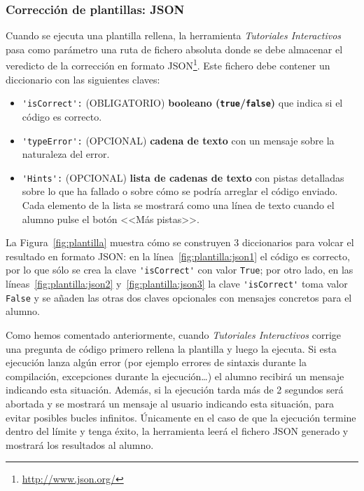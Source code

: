 \documentclass[]{article}
\newcommand{\code}[1]{{\lstinline[basicstyle=\ttfamily,mathescape]!#1!}}
\newcommand{\toolname}{\emph{Tutoriales Interactivos}}
\begin{document}
\subsubsection{Corrección de plantillas: JSON}
Cuando se ejecuta una plantilla rellena, la herramienta \toolname{} pasa como parámetro una ruta de fichero absoluta donde se debe almacenar el veredicto de la corrección en formato JSON\footnote{\url{http://www.json.org/}}. Este fichero debe contener un diccionario con las siguientes claves:
\begin{itemize}
	\item \code{'isCorrect':} {\sf (OBLIGATORIO)} \textbf{booleano (\code{true}/\code{false})} que indica si el código es correcto.
	\item \code{'typeError':} {\sf (OPCIONAL)} \textbf{cadena de texto} con un mensaje sobre la naturaleza del error. 
	\item \code{'Hints':} {\sf (OPCIONAL)} \textbf{lista de cadenas de texto} con pistas detalladas sobre lo que ha fallado o sobre cómo se podría arreglar el código enviado. Cada elemento de la lista se mostrará como una línea de texto cuando el alumno pulse el botón <<Más pistas>>.
\end{itemize}
La Figura~\ref{fig:plantilla} muestra cómo se construyen 3 diccionarios para volcar el resultado en formato JSON: en la línea~\ref{fig:plantilla:json1} el código es correcto, por lo que sólo se crea la clave \code{'isCorrect'} con valor \code{True}; por otro lado, en las líneas~\ref{fig:plantilla:json2} y~\ref{fig:plantilla:json3} la clave \code{'isCorrect'} toma valor \code{False} y se añaden las otras dos claves opcionales con mensajes concretos para el alumno.

Como hemos comentado anteriormente, cuando \toolname{} corrige una pregunta de código primero rellena la plantilla y luego la ejecuta. Si esta ejecución lanza algún error (por ejemplo errores de sintaxis durante la compilación, excepciones durante la ejecución\ldots) el alumno recibirá un mensaje indicando esta situación.
Además, si la ejecución tarda más de 2 segundos será abortada y se mostrará un mensaje al usuario indicando esta situación, para evitar posibles bucles infinitos. 
Únicamente en el caso de que la ejecución termine dentro del límite y tenga éxito, la herramienta leerá el fichero JSON generado y mostrará los resultados al alumno.%
\end{document}
